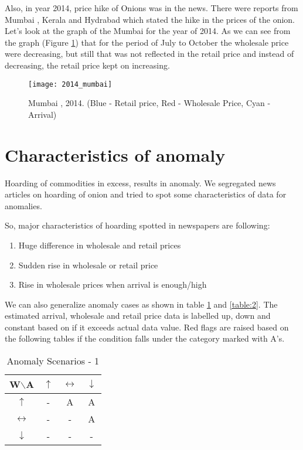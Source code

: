 Also, in year 2014, price hike of Onions was in the news. There were reports from Mumbai \cite{Onion68:online}, Kerala \cite{Keral99:online} and Hydrabad \cite{Rains78:online} which stated the hike in the prices of the onion. Let's look at the graph of the Mumbai for the year of 2014. As we can see from the graph (Figure \ref{fig:Mumbai2014}) that for the period of July to October the wholesale price were decreasing, but still that was not reflected in the retail price and instead of decreasing, the retail price kept on increasing.\\


\begin{figure}[h]
\begin{center}    
\texttt{[image: 2014\_mumbai]}
\caption{Mumbai , 2014. (Blue - Retail price, Red - Wholesale Price, Cyan - Arrival)}
\label{fig:Mumbai2014}
\end{center}
\end{figure}

\section{Characteristics of anomaly}

Hoarding of commodities in excess, results in anomaly. We segregated news articles on hoarding of onion and tried to spot some characteristics of data for anomalies.

So, major characteristics of hoarding spotted in newspapers are following:

\begin{enumerate}
\item Huge difference in wholesale and retail prices
\item Sudden rise in wholesale or retail price
\item Rise in wholesale prices when arrival is enough/high
\end{enumerate}

We can also generalize anomaly cases as shown in table \ref{table:1} and \ref{table:2}. The estimated arrival, wholesale and retail price data is labelled up, down and constant based on if it exceeds actual data value. Red flags are raised based on the following tables if the condition falls under the category marked with {\color{red}A}’s.


\begin{table}
\centering
\begin{tabular}{ | c | c | c | c |}  
  \hline
  \textbf{W$\backslash$A} & \textbf{$\uparrow$} & \textbf{$\leftrightarrow$}  & \textbf{$\downarrow$} \\ \hline
  \textbf{$\uparrow$} & - & {\color{red}A} & {\color{red}A} \\ \hline
  \textbf{$\leftrightarrow$} & - & - & {\color{red}A} \\ \hline
  \textbf{$\downarrow$} & - & - & - \\ \hline
\end{tabular}
\caption{Anomaly Scenarios - 1}
\label{table:1}
\end{table}

